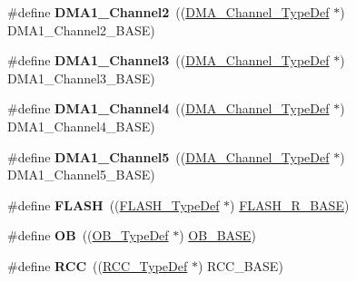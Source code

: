 \begin{DoxyCompactItemize}
\mbox{\label{group___peripheral__declaration_ga23d7631dd10c645e06971b2543ba2949}} 
\#define {\bfseries D\+M\+A1\+\_\+\+Channel2}~((\hyperlink{struct_d_m_a___channel___type_def}{D\+M\+A\+\_\+\+Channel\+\_\+\+Type\+Def} $\ast$) D\+M\+A1\+\_\+\+Channel2\+\_\+\+B\+A\+SE)
\item 
\mbox{\label{group___peripheral__declaration_gacf7b6093a37b306d7f1f50b2f200f0d0}} 
\#define {\bfseries D\+M\+A1\+\_\+\+Channel3}~((\hyperlink{struct_d_m_a___channel___type_def}{D\+M\+A\+\_\+\+Channel\+\_\+\+Type\+Def} $\ast$) D\+M\+A1\+\_\+\+Channel3\+\_\+\+B\+A\+SE)
\item 
\mbox{\label{group___peripheral__declaration_gad2c42743316bf64da557130061b1f56a}} 
\#define {\bfseries D\+M\+A1\+\_\+\+Channel4}~((\hyperlink{struct_d_m_a___channel___type_def}{D\+M\+A\+\_\+\+Channel\+\_\+\+Type\+Def} $\ast$) D\+M\+A1\+\_\+\+Channel4\+\_\+\+B\+A\+SE)
\item 
\mbox{\label{group___peripheral__declaration_ga06ff98ddef3c962795d2e2444004abff}} 
\#define {\bfseries D\+M\+A1\+\_\+\+Channel5}~((\hyperlink{struct_d_m_a___channel___type_def}{D\+M\+A\+\_\+\+Channel\+\_\+\+Type\+Def} $\ast$) D\+M\+A1\+\_\+\+Channel5\+\_\+\+B\+A\+SE)
\item 
\mbox{\label{group___peripheral__declaration_ga844ea28ba1e0a5a0e497f16b61ea306b}} 
\#define {\bfseries F\+L\+A\+SH}~((\hyperlink{struct_f_l_a_s_h___type_def}{F\+L\+A\+S\+H\+\_\+\+Type\+Def} $\ast$) \hyperlink{group___peripheral__memory__map_ga8e21f4845015730c5731763169ec0e9b}{F\+L\+A\+S\+H\+\_\+\+R\+\_\+\+B\+A\+SE})
\item 
\mbox{\label{group___peripheral__declaration_gad2d5f875cdc6d696735f20fa23a895c3}} 
\#define {\bfseries OB}~((\hyperlink{struct_o_b___type_def}{O\+B\+\_\+\+Type\+Def} $\ast$) \hyperlink{group___peripheral__memory__map_gab5b5fb155f9ee15dfb6d757da1adc926}{O\+B\+\_\+\+B\+A\+SE})
\item 
\mbox{\label{group___peripheral__declaration_ga74944438a086975793d26ae48d5882d4}} 
\#define {\bfseries R\+CC}~((\hyperlink{struct_r_c_c___type_def}{R\+C\+C\+\_\+\+Type\+Def} $\ast$) R\+C\+C\+\_\+\+B\+A\+SE)

\end{DoxyCompactItemize}
